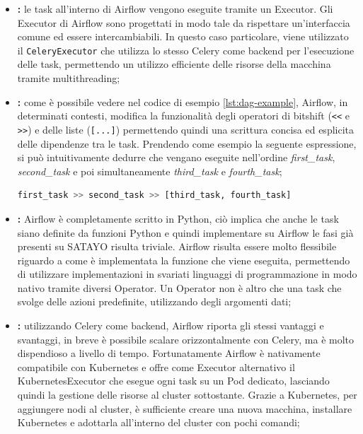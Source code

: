 \begin{itemize}
  \item \textbf{:} le task all'interno di Airflow
    vengono eseguite tramite un Executor. Gli Executor di Airflow sono progettati
    in modo tale da rispettare un'interfaccia comune ed essere intercambiabili.
    In questo caso particolare, viene utilizzato il \texttt{CeleryExecutor} che
    utilizza lo stesso Celery come backend per l'esecuzione delle task, permettendo
    un utilizzo efficiente delle risorse della macchina tramite multithreading;

  \item \textbf{:} come è possibile vedere nel
    codice di esempio \ref{lst:dag-example}, Airflow, in determinati contesti, modifica
    la funzionalità degli operatori di bitshift (\texttt{<<} e \texttt{>>}) e delle
    liste (\texttt{[...]}) permettendo quindi una scrittura concisa ed esplicita
    delle dipendenze tra le task. Prendendo come esempio la seguente espressione,
    si può intuitivamente dedurre che vengano eseguite nell'ordine \textit{first\_task},
    \textit{second\_task} e poi simultaneamente \textit{third\_task} e \textit{fourth\_task};

    \begin{lstlisting}[language=Python]
first_task >> second_task >> [third_task, fourth_task]
\end{lstlisting}

  \item \textbf{:} Airflow è completamente
    scritto in Python, ciò implica che anche le task siano definite da funzioni Python
    e quindi implementare su Airflow le fasi già presenti su SATAYO risulta triviale.
    Airflow risulta essere molto flessibile riguardo a come è implementata la
    funzione che viene eseguita, permettendo di utilizzare implementazioni in svariati
    linguaggi di programmazione in modo nativo tramite diversi Operator. Un
    Operator non è altro che una task che svolge delle azioni predefinite, utilizzando
    degli argomenti dati;

  \item \textbf{:} utilizzando Celery come backend, Airflow
    riporta gli stessi vantaggi e svantaggi, in breve è possibile scalare
    orizzontalmente con Celery, ma è molto dispendioso a livello di tempo.
    Fortunatamente Airflow è nativamente compatibile con Kubernetes e offre come
    Executor alternativo il KubernetesExecutor che esegue ogni task su un Pod
    dedicato, lasciando quindi la gestione delle risorse al cluster sottostante.
    Grazie a Kubernetes, per aggiungere nodi al cluster, è sufficiente creare
    una nuova macchina, installare Kubernetes e adottarla all'interno del cluster
    con pochi comandi;


\end{itemize}
